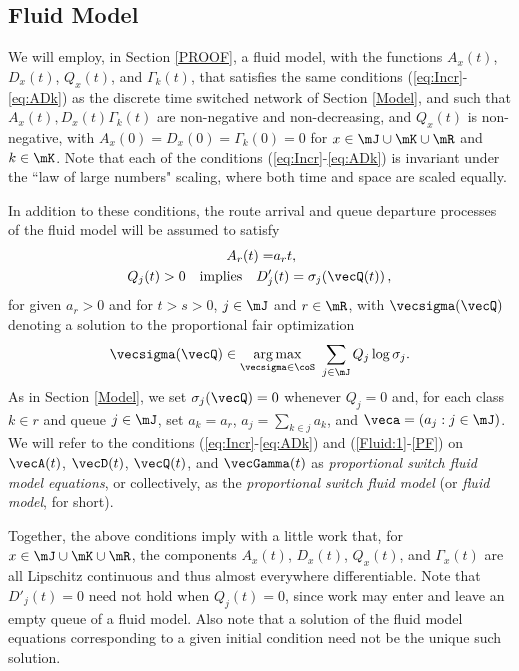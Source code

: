 \documentclass{amsart}
\begin{document}
\subsection{Fluid Model}\label{fluidmodel}

We will employ, in Section \ref{PROOF}, a fluid model, with the functions  
$A_x(t)$, $D_x(t)$, $Q_x(t)$, and $\Gamma_k(t)$, 
that satisfies the same conditions (\ref{eq:Incr}-\ref{eq:ADk}) as the discrete time switched network of Section \ref{Model}, and such that
$A_x(t), D_x(t)$$\Gamma_k(t)$ are non-negative and non-decreasing,
and $Q_x(t)$ is non-negative, with $A_x(0) = D_x(0)=\Gamma_k(0) =0$ for $x\in \mJ\cup \mK\cup \mR$ and $k\in\mK$.
Note that each of the conditions (\ref{eq:Incr}-\ref{eq:ADk}) is invariant under the ``law of large numbers" scaling, where both time and space are scaled equally. 

In addition to these conditions, the route arrival and queue departure processes of the fluid model will be assumed to satisfy
\begin{align}
A_r(t) =& a_r t \label{Fluid:1},\\
Q_j(t) >0 \quad \text{implies} \quad   D_j\rq{}&(t) = \sigma_j ( \vecQ(t))\,, \label{Fluid:3}
\end{align}
for given $a_r > 0$ and for $t>s>0$, $j\in\mJ$ and $r\in\mR$, with $\vecsigma(\vecQ)$ denoting a solution to the proportional fair optimization
\begin{equation}\label{PF}
\vecsigma(\vecQ) \in \operatorname*{arg\,max}_{\vecsigma\in \coS} \,\,\sum_{j\in\mJ} Q_j \log \sigma_j.
\end{equation}
As in Section \ref{Model}, we set $\sigma_j(\vecQ)=0$ whenever $Q_j=0$ and, for each class $k\in r$ and queue $j\in\mJ$, set $a_k = a_{r}$, $a_j = \sum_{k \in j} a_k$, and $\veca=(a_j : j\in\mJ)$.
We will refer to the conditions (\ref{eq:Incr}-\ref{eq:ADk}) and (\ref{Fluid:1}-\ref{PF}) on $\vecA(t)$, $\vecD(t)$, $\vecQ(t)$, and $\vecGamma (t)$ as \emph{proportional switch fluid model equations}, or collectively, as the \emph{proportional switch fluid model} (or \emph{fluid model}, for short).

Together, the above conditions imply with a little work that, for $x\in \mJ\cup \mK\cup \mR $, the components $A_x (t)$, $D_x (t)$, $Q_x (t)$, and $\Gamma_x (t)$ are all Lipschitz continuous and thus almost everywhere differentiable.
Note that $D'_j(t)=0$ need not hold when $Q_j(t)=0$, since work may
enter and leave an empty queue of a fluid model.  Also note that a solution of the fluid model equations corresponding
to a given initial condition need not be the unique such solution.  
\end{document}
